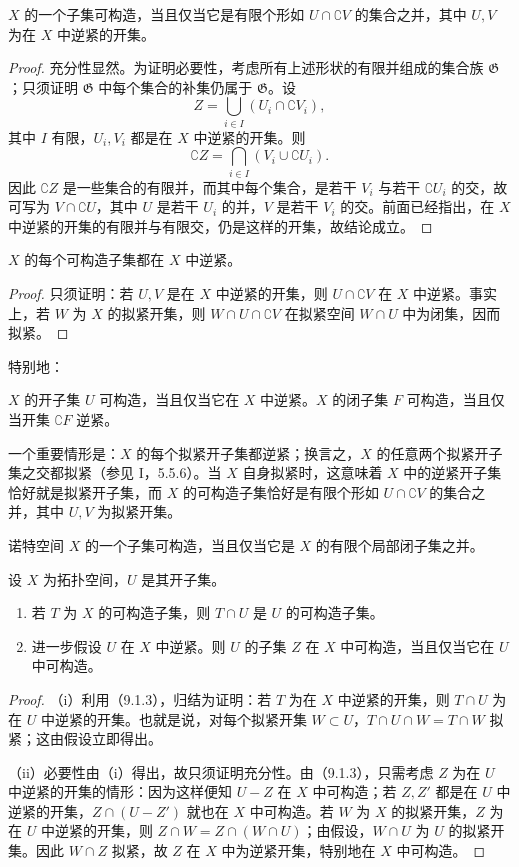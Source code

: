 $X$ 的一个子集可构造，当且仅当它是有限个形如 $U\cap\complement V$ 的集合之并，其中 $U,V$ 为在 $X$ 中逆紧的开集。
\begin{proof}
充分性显然。为证明必要性，考虑所有上述形状的有限并组成的集合族 $\mathfrak G$；只须证明 $\mathfrak G$ 中每个集合的补集仍属于 $\mathfrak G$。设
\[
Z=\bigcup_{i\in I}(U_i\cap\complement V_i),
\]
其中 $I$ 有限，$U_i,V_i$ 都是在 $X$ 中逆紧的开集。则
\[
\complement Z=\bigcap_{i\in I}(V_i\cup\complement U_i).
\]
因此 $\complement Z$ 是一些集合的有限并，而其中每个集合，是若干 $V_i$ 与若干 $\complement U_i$ 的交，故可写为 $V\cap\complement U$，其中 $U$ 是若干 $U_i$ 的并，$V$ 是若干 $V_i$ 的交。前面已经指出，在 $X$ 中逆紧的开集的有限并与有限交，仍是这样的开集，故结论成立。
\end{proof}

$X$ 的每个可构造子集都在 $X$ 中逆紧。
\begin{proof}
只须证明：若 $U,V$ 是在 $X$ 中逆紧的开集，则 $U\cap\complement V$ 在 $X$ 中逆紧。事实上，若 $W$ 为 $X$ 的拟紧开集，则 $W\cap U\cap\complement V$ 在拟紧空间 $W\cap U$ 中为闭集，因而拟紧。
\end{proof}
特别地：

$X$ 的开子集 $U$ 可构造，当且仅当它在 $X$ 中逆紧。$X$ 的闭子集 $F$ 可构造，当且仅当开集 $\complement F$ 逆紧。

一个重要情形是：$X$ 的每个拟紧开子集都逆紧；换言之，$X$ 的任意两个拟紧开子集之交都拟紧（参见 I，5.5.6）。当 $X$ 自身拟紧时，这意味着 $X$ 中的逆紧开子集恰好就是拟紧开子集，而 $X$ 的可构造子集恰好是有限个形如 $U\cap\complement V$ 的集合之并，其中 $U,V$ 为拟紧开集。

诺特空间 $X$ 的一个子集可构造，当且仅当它是 $X$ 的有限个局部闭子集之并。

设 $X$ 为拓扑空间，$U$ 是其开子集。
\begin{enumerate}[label=(\roman*)]
\item 若 $T$ 为 $X$ 的可构造子集，则 $T\cap U$ 是 $U$ 的可构造子集。
\item 进一步假设 $U$ 在 $X$ 中逆紧。则 $U$ 的子集 $Z$ 在 $X$ 中可构造，当且仅当它在 $U$ 中可构造。
\end{enumerate}
\begin{proof}
（i）利用（9.1.3），归结为证明：若 $T$ 为在 $X$ 中逆紧的开集，则 $T\cap U$ 为在 $U$ 中逆紧的开集。也就是说，对每个拟紧开集 $W\subset U$，$T\cap U\cap W=T\cap W$ 拟紧；这由假设立即得出。

（ii）必要性由（i）得出，故只须证明充分性。由（9.1.3），只需考虑 $Z$ 为在 $U$ 中逆紧的开集的情形：因为这样便知 $U-Z$ 在 $X$ 中可构造；若 $Z,Z'$ 都是在 $U$ 中逆紧的开集，$Z\cap(U-Z')$ 就也在 $X$ 中可构造。若 $W$ 为 $X$ 的拟紧开集，$Z$ 为在 $U$ 中逆紧的开集，则 $Z\cap W=Z\cap(W\cap U)$；由假设，$W\cap U$ 为 $U$ 的拟紧开集。因此 $W\cap Z$ 拟紧，故 $Z$ 在 $X$ 中为逆紧开集，特别地在 $X$ 中可构造。
\end{proof}


